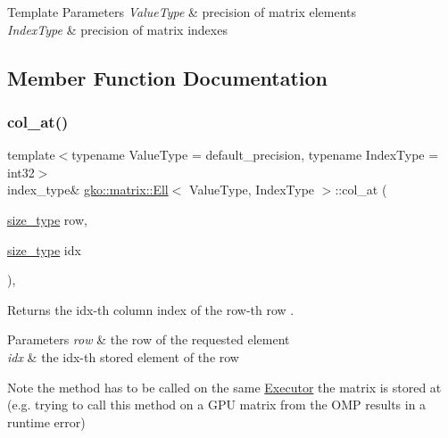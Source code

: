 \begin{DoxyTemplParams}{Template Parameters}
{\em Value\+Type} & precision of matrix elements \\
\hline
{\em Index\+Type} & precision of matrix indexes \\
\hline
\end{DoxyTemplParams}


\subsection{Member Function Documentation}
\mbox{\label{classgko_1_1matrix_1_1Ell_a1ef17227a6de85a1c12ebc106abbfc32}} 
\subsubsection{\texorpdfstring{col\+\_\+at()}{col\_at()}\hspace{0.1cm}{\footnotesize\ttfamily [1/2]}}
{\footnotesize\ttfamily template$<$typename Value\+Type = default\+\_\+precision, typename Index\+Type = int32$>$ \\
index\+\_\+type\& \hyperlink{classgko_1_1matrix_1_1Ell}{gko\+::matrix\+::\+Ell}$<$ Value\+Type, Index\+Type $>$\+::col\+\_\+at (\begin{DoxyParamCaption}\item[{\hyperlink{namespacegko_a6e5c95df0ae4e47aab2f604a22d98ee7}{size\+\_\+type}}]{row,  }\item[{\hyperlink{namespacegko_a6e5c95df0ae4e47aab2f604a22d98ee7}{size\+\_\+type}}]{idx }\end{DoxyParamCaption})\hspace{0.3cm}{\ttfamily [inline]}, {\ttfamily [noexcept]}}



Returns the {\ttfamily idx}-\/th column index of the {\ttfamily row}-\/th row . 


\begin{DoxyParams}{Parameters}
{\em row} & the row of the requested element \\
\hline
{\em idx} & the idx-\/th stored element of the row\\
\hline
\end{DoxyParams}
\begin{DoxyNote}{Note}
the method has to be called on the same \hyperlink{classgko_1_1Executor}{Executor} the matrix is stored at (e.\+g. trying to call this method on a G\+PU matrix from the O\+MP results in a runtime error) 
\end{DoxyNote}


